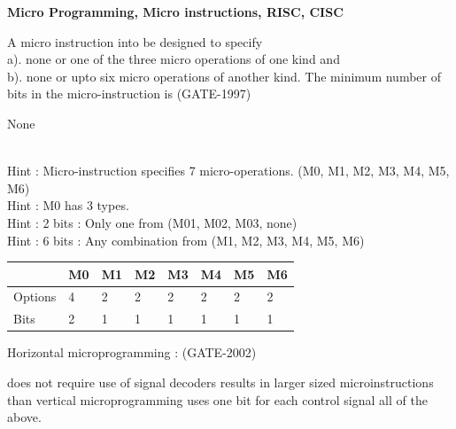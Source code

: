 
\centerline{\textbf{ \LARGE Micro Programming, Micro instructions, RISC, CISC}}


\begin{questyle}
  \question  A micro instruction into be designed to specify \\ a). none or one of the three micro
             operations of one kind and \\b). none or upto six micro operations of another kind.
             The minimum number of bits in the micro-instruction is  (GATE-1997)

  \begin{oneparchoices}
    \choice         None
  \end{oneparchoices}
  \\ Hint : Micro-instruction specifies 7 micro-operations. (M0, M1, M2, M3, M4, M5, M6)
  \\ Hint : M0 has 3 types.
  \\ Hint : 2 bits : Only one from (M01, M02, M03, none)
  \\ Hint : 6 bits : Any combination from (M1, M2, M3, M4, M5, M6)

    \begin{myTableStyle} \begin{tabular}{ |m{1cm}|m{0.2cm}|m{0.2cm}|m{0.2cm}|m{0.2cm}|m{0.2cm}|m{0.2cm}|m{0.2cm}| } \hline
                & M0 & M1 & M2 & M3 & M4 & M5 & M6 \\ \hline
        Options & 4  & 2  & 2  & 2  & 2  & 2  & 2 \\ \hline
        Bits    & 2  & 1  & 1  & 1  & 1  & 1  & 1 \\ \hline
    \end{tabular} \end{myTableStyle} \vspace{0.08in}
\end{questyle}

\begin{questyle}
  \question  Horizontal microprogramming :  (GATE-2002)

  \begin{choices}
    \choice         does not require use of signal decoders
    \choice         results in larger sized microinstructions than vertical microprogramming
    \choice         uses one bit for each control signal
    \CorrectChoice  all of the above.
  \end{choices}
\end{questyle}

